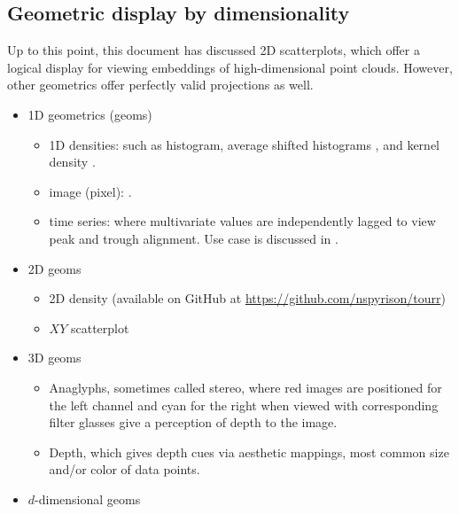 \documentclass{monashthesis}
\begin{document}
\subsection{Geometric display by dimensionality}\label{sec:geom_display}

Up to this point, this document has discussed 2D scatterplots, which
offer a logical display for viewing embeddings of high-dimensional point
clouds. However, other geometrics offer perfectly valid projections as
well.

\begin{itemize}
\tightlist
\item
  1D geometrics (geoms)

  \begin{itemize}
  \tightlist
  \item
    1D densities: such as histogram, average shifted histograms
    \autocite{scott_averaged_1985}, and kernel density
    \autocite{scott_incorporating_1995}.
  \item
    image (pixel): \autocite{wegman_pixel_2001}.
  \item
    time series: where multivariate values are independently lagged to
    view peak and trough alignment. Use case is discussed in
    \autocite{cook_manual_1997}.
  \end{itemize}
\item
  2D geoms

  \begin{itemize}
  \tightlist
  \item
    2D density (available on GitHub at
    \url{https://github.com/nspyrison/tourr})
  \item
    \(XY\) scatterplot
  \end{itemize}
\item
  3D geoms

  \begin{itemize}
  \tightlist
  \item
    Anaglyphs, sometimes called stereo, where red images are positioned
    for the left channel and cyan for the right when viewed with
    corresponding filter glasses give a perception of depth to the
    image.
  \item
    Depth, which gives depth cues via aesthetic mappings, most common
    size and/or color of data points.
  \end{itemize}
\item
  \(d\)-dimensional geoms


\end{itemize}
\end{document}
